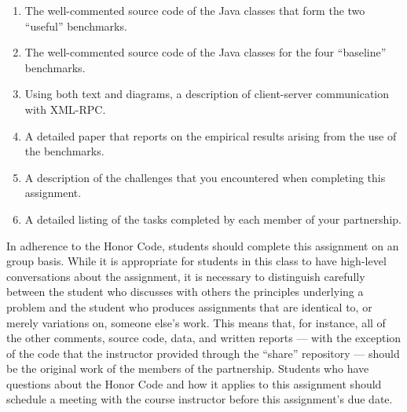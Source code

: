\begin{enumerate}
  \itemsep 0em

    \item The well-commented source code of the Java classes that form the two ``useful'' benchmarks.

    \item The well-commented source code of the Java classes for the four ``baseline'' benchmarks.

    \item Using both text and diagrams, a description of client-server communication with XML-RPC.

    \item A detailed paper that reports on the empirical results arising from the use of the benchmarks.

    \item A description of the challenges that you encountered when completing this assignment.

    \item A detailed listing of the tasks completed by each member of your partnership.

\end{enumerate}

\vspace*{-.15in}


In adherence to the Honor Code, students should complete this assignment on an group basis. While it is appropriate for
students in this class to have high-level conversations about the assignment, it is necessary to distinguish carefully
between the student who discusses with others the principles underlying a problem and the student who produces
assignments that are identical to, or merely variations on, someone else's work.  This means that, for instance, all of
the other comments, source code, data, and written reports --- with the exception of the code that the instructor
provided through the ``share'' repository --- should be the original work of the members of the partnership.  Students
who have questions about the Honor Code and how it applies to this assignment should schedule a meeting with the course
instructor before this assignment's due date.


